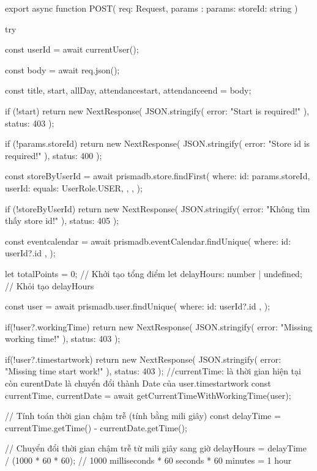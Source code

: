 export async function POST(
  req: Request,
  { params }: { params: { storeId: string } }
) {
  try {
    const userId = await currentUser();

    const body = await req.json();

    const { title, start, allDay, attendancestart, attendanceend } = body;

    if (!start) {
      return new NextResponse(
        JSON.stringify({ error: "Start is required!" }),
        { status: 403 }
      );
    }

    if (!params.storeId) {
      return new NextResponse(
        JSON.stringify({ error: "Store id is required!" }),
        { status: 400 }
      );
    }

    const storeByUserId = await prismadb.store.findFirst({
      where: {
        id: params.storeId,
        userId: {
          equals: UserRole.USER,
        },
      },
    });

    if (!storeByUserId) {
      return new NextResponse(
        JSON.stringify({ error: "Không tìm thấy store id!" }),
        { status: 405 }
      );
    }

    const eventcalendar = await prismadb.eventCalendar.findUnique({
      where: { id: userId?.id },
    });

    let totalPoints = 0; // Khởi tạo tổng điểm
    let delayHours: number | undefined; // Khỏi tạo delayHours

    const user = await prismadb.user.findUnique({
      where: { id: userId?.id },
    });

    if(!user?.workingTime){
      return new NextResponse(
        JSON.stringify({ error: "Missing working time!" }),
        { status: 403 }
      );
    }

    if(!user?.timestartwork){
      return new NextResponse(
        JSON.stringify({ error: "Missing time start work!" }),
        { status: 403 }
      );
    }
    //currentTime: là thời gian hiện tại  còn curentDate là chuyển đổi thành Date của user.timestartwork
    const { currentTime, currentDate } = await getCurrentTimeWithWorkingTime(user);

      // Tính toán thời gian chậm trễ (tính bằng mili giây)
      const delayTime = currentTime.getTime() - currentDate.getTime();

      // Chuyển đổi thời gian chậm trễ từ mili giây sang giờ
       delayHours = delayTime / (1000 * 60 * 60); // 1000 milliseconds * 60 seconds * 60 minutes = 1 hour

}}
